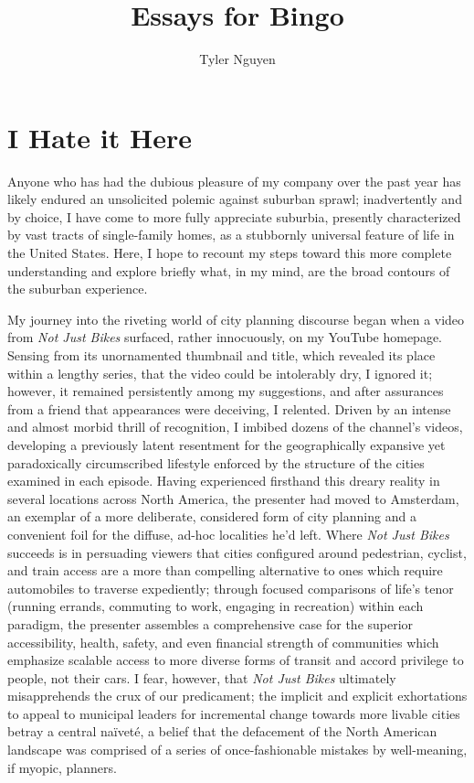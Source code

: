 \documentclass[oneside, a5paper]{book}
\begin{document}
\title{Essays for Bingo}
\author{Tyler Nguyen}
\maketitle
\chapter{I Hate it Here}
Anyone who has had the dubious pleasure of my company over the past year has likely endured an unsolicited polemic against suburban sprawl; inadvertently and by choice, I have come to more fully appreciate suburbia, presently characterized by vast tracts of single-family homes, as a stubbornly universal feature of life in the United States. Here, I hope to recount my steps toward this more complete understanding and explore briefly what, in my mind, are the broad contours of the suburban experience.

My journey into the riveting world of city planning discourse began when a video from \textit{Not Just Bikes} surfaced, rather innocuously, on my YouTube homepage. Sensing from its unornamented thumbnail and title, which revealed its place within a lengthy series, that the video could be intolerably dry, I ignored it; however, it remained persistently among my suggestions, and after assurances from a friend that appearances were deceiving, I relented. Driven by an intense and almost morbid thrill of recognition, I imbibed dozens of the channel's videos, developing a previously latent resentment for the geographically expansive yet paradoxically circumscribed lifestyle enforced by the structure of the cities examined in each episode. Having experienced firsthand this dreary reality in several locations across North America, the presenter had moved to Amsterdam, an exemplar of a more deliberate, considered form of city planning and a convenient foil for the diffuse, ad-hoc localities he'd left. Where \textit{Not Just Bikes} succeeds is in persuading viewers that cities configured around pedestrian, cyclist, and train access are a more than compelling alternative to ones which require automobiles to traverse expediently; through focused comparisons of life's tenor (running errands, commuting to work, engaging in recreation) within each paradigm, the presenter assembles a comprehensive case for the superior accessibility, health, safety, and even financial strength of communities which emphasize scalable access to more diverse forms of transit and accord privilege to people, not their cars. I fear, however, that \textit{Not Just Bikes} ultimately misapprehends the crux of our predicament; the implicit and explicit exhortations to appeal to municipal leaders for incremental change towards more livable cities betray a central na\"ivet\'e, a belief that the defacement of the North American landscape was comprised of a series of once-fashionable mistakes by well-meaning, if myopic, planners.
\end{document}
